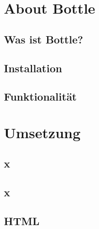 \clearpage
\section{About Bottle}
\subsection{Was ist Bottle?}
\subsection{Installation}
\subsection{Funktionalität}
\section{Umsetzung}
\subsection{x}
\subsection{x}
\subsection{HTML}
